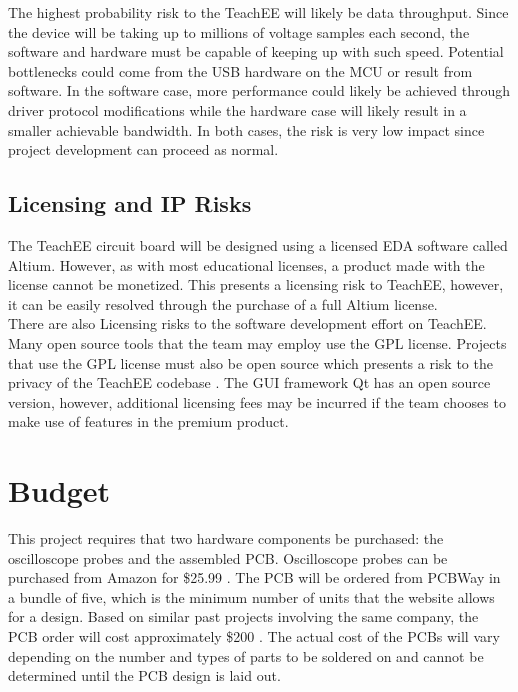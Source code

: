 \documentclass[letterpaper,12pt]{article}
\begin{document}
\noindent
The highest probability risk to the TeachEE will likely be data throughput.
Since the device will be taking up to millions of voltage samples each second,
the software and hardware must be capable of keeping up with such speed.
Potential bottlenecks could come from the USB hardware on the MCU or result from
software. In the software case, more performance could likely be achieved
through driver protocol modifications while the hardware case will likely result
in a smaller achievable bandwidth. In both cases, the risk is very low impact
since project development can proceed as normal.

\subsection{Licensing and IP Risks}
The TeachEE circuit board will be designed using a licensed EDA software called
Altium. However, as with most educational licenses, a product made with the
license cannot be monetized. This presents a licensing risk to TeachEE, however,
it can be easily resolved through the purchase of a full Altium license. \\

\noindent
There are also Licensing risks to the software development effort on TeachEE.
Many open source tools that the team may employ use the GPL license. Projects
that use the GPL license must also be open source which presents a risk to the
privacy of the TeachEE codebase \cite{gpl}. The GUI framework Qt has an open
source version, however, additional licensing fees may be incurred if the team
chooses to make use of features in the premium product.

\section{Budget} %
This project requires that two hardware components be purchased: the
oscilloscope probes and the assembled PCB. Oscilloscope probes can be purchased
from Amazon for \$25.99 \cite{noauthor_autoutlet_nodate}. The PCB will be
ordered from PCBWay in a bundle of five, which is the minimum number of units
that the website allows for a design. Based on similar past projects involving
the same company, the PCB order will cost approximately \$200
\cite{noauthor_china_nodate}. The actual cost of the PCBs will vary depending on
the number and types of parts to be soldered on and cannot be determined until
the PCB design is laid out. \\
\end{document}
